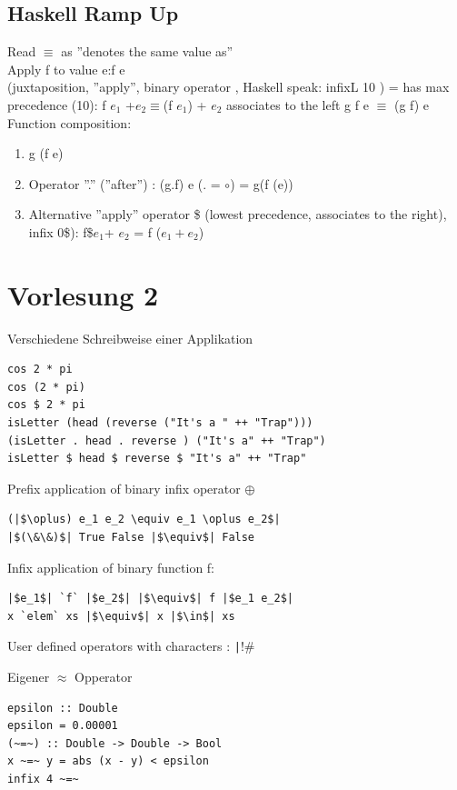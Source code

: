 \documentclass{article}
\begin{document}
\subsection{Haskell Ramp Up}
Read $\equiv$ as ''denotes the same value as''\\
Apply f to value e:\quad f \textvisiblespace e \\(juxtaposition, ''apply'', binary operator \textvisiblespace, Haskell speak: infixL 10 \textvisiblespace)
= \textvisiblespace has max precedence (10): f $e_1$ +$e_2 \equiv $(f $e_1$) + $e_2$
\textvisiblespace associates to the left g \textvisiblespace f \textvisiblespace e $\equiv$ (g f) e
Function composition:
\begin{enumerate}[-]
\item g (f e)
\item Operator ''.'' (''after'') : (g.f) e (. = $\circ$) = g(f (e))
\item Alternative ''apply'' operator \$ (lowest precedence, associates to the right), infix 0\$): f\$$e_1$+ $e_2$ = f ($e_1 + e_2$)
\end{enumerate}
\section{Vorlesung 2}
\begin{listing}
\caption{Verschiedene Schreibweise einer Applikation}
\begin{verbatim}
cos 2 * pi
cos (2 * pi)
cos $ 2 * pi
isLetter (head (reverse ("It's a " ++ "Trap")))
(isLetter . head . reverse ) ("It's a" ++ "Trap")
isLetter $ head $ reverse $ "It's a" ++ "Trap"
\end{verbatim}
\end{listing}
\noindent Prefix application of binary infix operator $\oplus$
\begin{verbatim}
(|$\oplus) e_1 e_2 \equiv e_1 \oplus e_2$|
|$(\&\&)$| True False |$\equiv$| False
\end{verbatim}
Infix application of binary function f:
\begin{verbatim}
|$e_1$| `f` |$e_2$| |$\equiv$| f |$e_1 e_2$|
x `elem` xs |$\equiv$| x |$\in$| xs
\end{verbatim}
User defined operators with characters : \texttt|!#%
\begin{listing}
\caption{Eigener $\approx$ Opperator}
\begin{verbatim}
epsilon :: Double
epsilon = 0.00001
(~=~) :: Double -> Double -> Bool
x ~=~ y = abs (x - y) < epsilon
infix 4 ~=~ 
\end{verbatim}
\end{listing}
\end{document}
